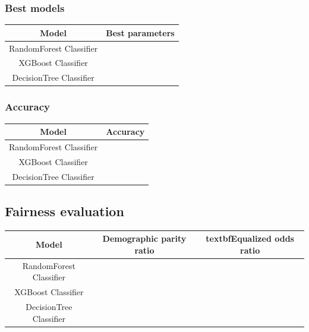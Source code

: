 \subsubsection{Best models}

\begin{tabular}{|c|c|}
    \hline
    \textbf{Model} & \textbf{Best parameters} \\
    \hline
    RandomForest Classifier  &  \\
    \hline
    XGBoost Classifier & \\
    \hline
    DecisionTree Classifier & \\
    \hline
\end{tabular}

\subsubsection{Accuracy}

\begin{tabular}{|c|c|}
    \hline
    \textbf{Model} & \textbf{Accuracy} \\ 
    \hline
    RandomForest Classifier  &  \\
    \hline
    XGBoost Classifier & \\
    \hline
    DecisionTree Classifier & \\ 
    \hline
\end{tabular}

\subsection{Fairness evaluation}

\begin{tabular}{|c|c|c|}
    \hline
    \textbf{Model} & \textbf{Demographic parity ratio} & textbf{Equalized odds ratio} \\
    \hline
    RandomForest Classifier & & \\
    \hline
    XGBoost Classifier & & \\
    \hline
    DecisionTree Classifier & & \\
    \hline
\end{tabular}
